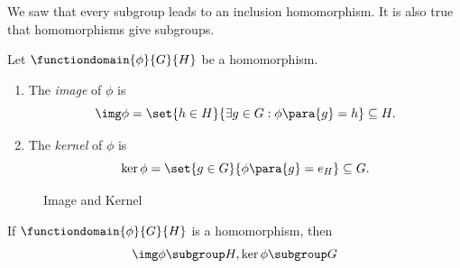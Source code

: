 We saw that every subgroup leads to an inclusion homomorphism. It is also true that homomorphisms give subgroups.

\begin{definition}
    \label{def:image-kernel}%
    Let \(\functiondomain{\phi}{G}{H}\) be a homomorphism.

    \begin{enumerate}
        \item The \emph{image} of \(\phi\) is
        \[
            \img \phi = \set{h \in H}{\exists g \in G: \phi\para{g} = h} \subseteq H.
        \]
        \item The \emph{kernel} of \(\phi\) is
        \[
            \ker \phi = \set{g \in G}{\phi\para{g} = e_H} \subseteq G.
        \]
    \end{enumerate}
\end{definition}

\begin{figure}[ht!]
    \centering
    \caption{Image and Kernel}
    \label{fig:image-and-kernel}
\end{figure}

\begin{proposition}
    If \(\functiondomain{\phi}{G}{H}\) is a homomorphism, then
    \[
        \img \phi \subgroup H, \ker \phi \subgroup G
    \]
\end{proposition}

